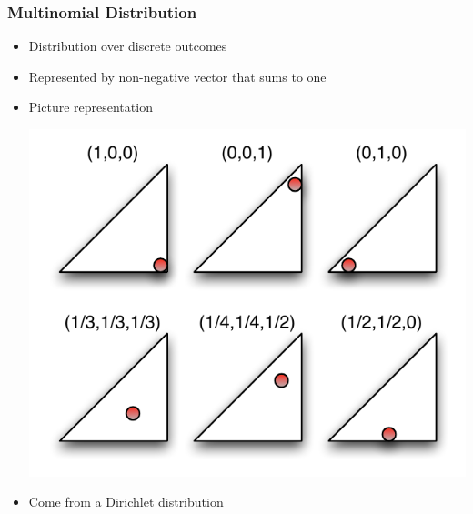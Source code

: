 \begin{frame}
	\frametitle{Multinomial Distribution}

	\begin{itemize}
		\item Distribution over discrete outcomes
		\item Represented by non-negative vector that sums to one
		\item Picture representation
	\begin{center}
\includegraphics[width=0.4\linewidth]{topic_models/multinomial}
	\end{center}
		\pause
		\item Come from a Dirichlet distribution

	\end{itemize}


\end{frame}

